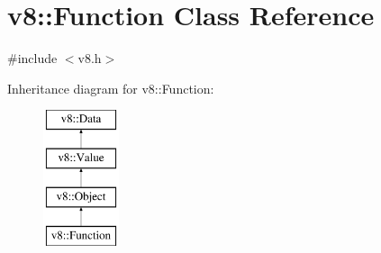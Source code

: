 \hypertarget{classv8_1_1Function}{}\section{v8\+:\+:Function Class Reference}
\label{classv8_1_1Function}


{\ttfamily \#include $<$v8.\+h$>$}

Inheritance diagram for v8\+:\+:Function\+:\begin{figure}[H]
\begin{center}
\leavevmode
\includegraphics[height=4.000000cm]{classv8_1_1Function}
\end{center}
\end{figure}
